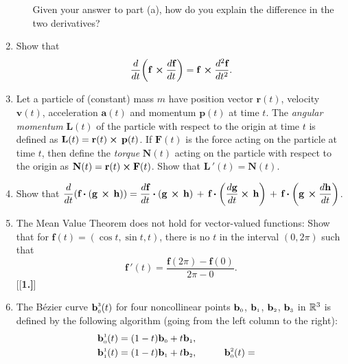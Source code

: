 \begin{enumerate}[\bfseries 1.]
\begin{enumerate}[(a)]
   Given your answer to part (a), how do you explain the difference in the two derivatives?
  \end{enumerate}
 \item Show that 
 \[\dfrac{d}{dt} \biggl( \textbf{f}\, \bm{\times} \dfrac{d\textbf{f}}{dt} \biggr) =
  \textbf{f}\, \bm{\times} \dfrac{d^2 \textbf{f}}{dt^2}.\]
 \item Let a particle of (constant) mass $m$ have position vector $\textbf{r}(t)$, velocity $\textbf{v}(t)$,
  acceleration $\textbf{a}(t)$ and momentum $\textbf{p}(t)$ at time $t$. The \emph{angular momentum} $\textbf{L}(t)$ of
  the particle with respect to the origin at time $t$ is defined as $\textbf{L}(t) =
  \textbf{r}(t) \bm{\times} \,\textbf{p}(t)$. If $\textbf{F}(t)$ is the force acting on the particle at time $t$, then
  define the \emph{torque} $\textbf{N}(t)$ acting on the particle with respect to the origin as
  $\textbf{N}(t) = \textbf{r}(t) \bm{\times} \textbf{F}(t)$. Show that $\textbf{L}\,'(t) = \textbf{N}(t)$.
 \item Show that $\dfrac{d}{dt} ( \textbf{f} \bm{\cdot} ( \textbf{g}\, \bm{\times} \,\textbf{h} ) ) =
  \dfrac{d\textbf{f}}{dt} \bm{\cdot} (\textbf{g}\, \bm{\times} \,\textbf{h}) \,+\,
  \textbf{f} \bm{\cdot} \biggl(\dfrac{d \textbf{g}}{dt} \bm{\times} \,\textbf{h}\biggr) \,+\,
  \textbf{f} \bm{\cdot} \biggl(\textbf{g}\, \bm{\times} \dfrac{d \textbf{h}}{dt}\biggr)$.
 \item The Mean Value Theorem does not hold for vector-valued functions:
 Show that for $\textbf{f}(t) = (\cos t, \sin t,t)$, there is no $t$ in the interval $(0,2\pi)$ such that
 \begin{displaymath}
  \textbf{f}\,'(t) = \dfrac{\textbf{f}(2\pi) - \textbf{f}(0)}{2\pi - 0} .
 \end{displaymath}
[{[\bfseries 1.]}]
 \item The B\'{e}zier curve $\textbf{b}_{\scriptscriptstyle 0}^{\scriptscriptstyle 3}(t)$ for four noncollinear points
  $\textbf{b}_{\scriptscriptstyle 0}$, $\textbf{b}_{\scriptscriptstyle 1}$, $\textbf{b}_{\scriptscriptstyle 2}$, $\textbf{b}_{\scriptscriptstyle 3}$ in $\mathbb{R}^{3}$ is
  defined by the following algorithm (going from the left column to the right):
  \begin{alignat*}{3}
   \ssub{\textbf{b}}{0}^{\scriptscriptstyle 1}(t) &= ( 1 - t )\ssub{\textbf{b}}{0} + t \ssub{\textbf{b}}{1},
    \\
   \ssub{\textbf{b}}{1}^{\scriptscriptstyle 1}(t) &= ( 1 - t )\ssub{\textbf{b}}{1} + t \ssub{\textbf{b}}{2}, \qquad
    & \ssub{\textbf{b}}{0}^{\scriptscriptstyle 2}(t) &=

\end{alignat*}
\end{enumerate}

